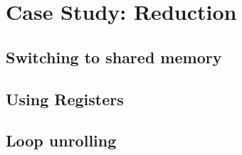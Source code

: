 
\section{Case Study: Reduction}

\subsection{Switching to shared memory}


\subsection{Using Registers}


\subsection{Loop unrolling}














